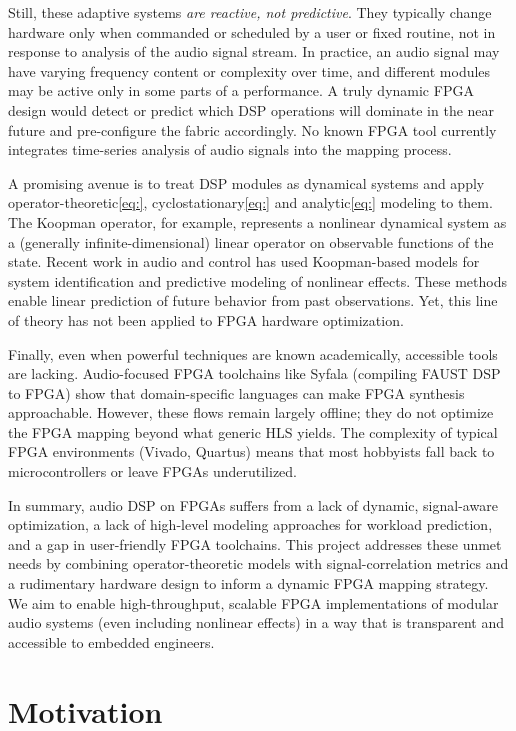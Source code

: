 \noindent Still, these adaptive systems \textit{are reactive, not predictive}. They typically change hardware only when commanded or scheduled by a user or fixed routine, not in response to analysis of the audio signal stream. In practice, an audio signal may have varying frequency content or complexity over time, and different modules may be active only in some parts of a performance. A truly dynamic FPGA design would detect or predict which DSP operations will dominate in the near future and pre-configure the fabric accordingly. No known FPGA tool currently integrates time-series analysis of audio signals into the mapping process.
\bigskip

\noindent A promising avenue is to treat DSP modules as dynamical systems and apply operator-theoretic\ref{eq:}, cyclostationary\ref{eq:} and analytic\ref{eq:} modeling to them. The Koopman operator, for example, represents a nonlinear dynamical system as a (generally infinite-dimensional) linear operator on observable functions of the state. Recent work in audio and control has used Koopman-based models for system identification and predictive modeling of nonlinear effects. These methods enable linear prediction of future behavior from past observations. Yet, this line of theory has not been applied to FPGA hardware optimization.
\bigskip

\noindent Finally, even when powerful techniques are known academically, accessible tools are lacking. Audio-focused FPGA toolchains like Syfala\cite{Syfala2024} (compiling FAUST DSP to FPGA) show that domain-specific languages can make FPGA synthesis approachable. However, these flows remain largely offline; they do not optimize the FPGA mapping beyond what generic HLS yields. The complexity of typical FPGA environments (Vivado, Quartus) means that most hobbyists fall back to microcontrollers or leave FPGAs underutilized.
\bigskip

\noindent In summary, audio DSP on FPGAs suffers from a lack of dynamic, signal-aware optimization, a lack of high-level modeling approaches for workload prediction, and a gap in user-friendly FPGA toolchains. This project addresses these unmet needs by combining operator-theoretic models with signal-correlation metrics and a rudimentary hardware design to inform a dynamic FPGA mapping strategy. We aim to enable high-throughput, scalable FPGA implementations of modular audio systems (even including nonlinear effects) in a way that is transparent and accessible to embedded engineers.

\section{Motivation}

